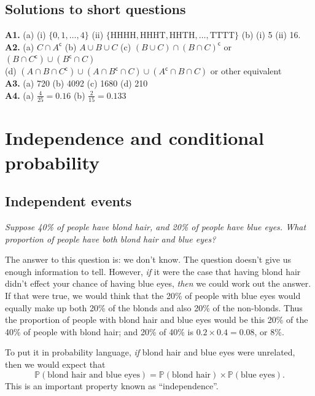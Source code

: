 \documentclass[
  a4paper,
]{book}
\theoremstyle{definition}
\theoremstyle{definition}
\theoremstyle{definition}
\theoremstyle{definition}
\theoremstyle{remark}
\begin{document}
\hypertarget{P2-short-sols}{%
\section*{Solutions to short questions}\label{P2-short-sols}}

\textbf{A1.} (a) (i) \(\{0,1,\dots, 4\}\) (ii) \(\{ \text{HHHH}, \text{HHHT}, \text{HHTH},\dots, \text{TTTT} \}\) (b) (i) 5 (ii) 16.\\
\textbf{A2.} (a) \(C \cap A^\mathsf{c}\) (b) \(A \cup B \cup C\) (c) \((B \cup C) \cap (B \cap C)^\mathsf{c}\) or \((B \cap C^\mathsf{c}) \cup (B^\mathsf{c}\cap C)\)\\
(d) \((A \cap B \cap C^\mathsf{c}) \cup (A \cap B^\mathsf{c}\cap C) \cup (A^\mathsf{c}\cap B \cap C)\) or other equivalent\\
\textbf{A3.} (a) 720 (b) 4092 (c) 1680 (d) 210\\
\textbf{A4.} (a) \(\frac{4}{25} = 0.16\) (b) \(\frac{2}{15} = 0.133\)

\hypertarget{L07-conditional}{%
\chapter{Independence and conditional probability}\label{L07-conditional}}

\hypertarget{independent-events}{%
\section{Independent events}\label{independent-events}}

\emph{Suppose 40\% of people have blond hair, and 20\% of people have blue eyes. What proportion of people have both blond hair and blue eyes?}

The answer to this question is: we don't know. The question doesn't give us enough information to tell. However, \emph{if} it were the case that having blond hair didn't effect your chance of having blue eyes, \emph{then} we could work out the answer. If that were true, we would think that the 20\% of people with blue eyes would equally make up both 20\% of the blonds and also 20\% of the non-blonds. Thus the proportion of people with blond hair and blue eyes would be this 20\% of the 40\% of people with blond hair; and 20\% of 40\% is \(0.2 \times 0.4 = 0.08\), or 8\%.

To put it in probability language, \emph{if} blond hair and blue eyes were unrelated, then we would expect that
\[ \mathbb P(\text{blond hair and blue eyes}) = \mathbb P(\text{blond hair}) \times \mathbb P(\text{blue eyes}) . \]
This is an important property known as ``independence''.
\end{document}

